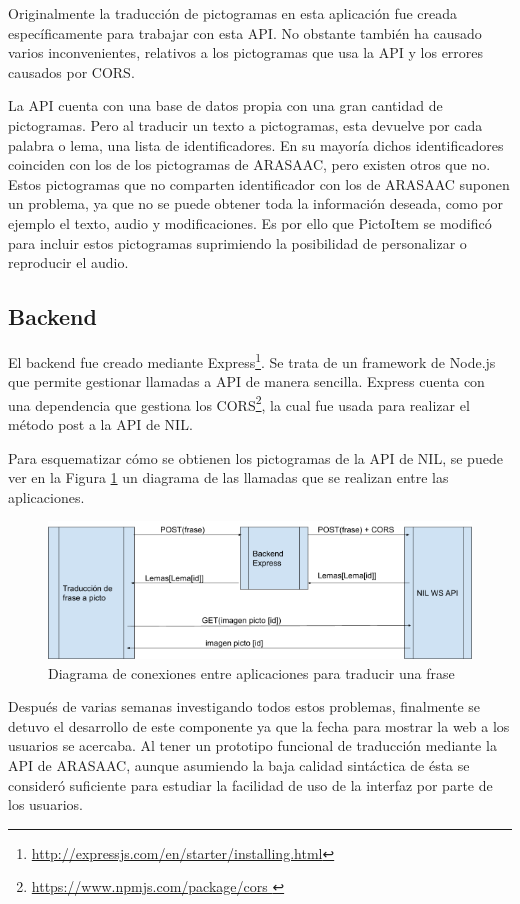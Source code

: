 Originalmente la traducción de pictogramas en esta aplicación fue creada específicamente para trabajar con esta API. No obstante también ha causado varios inconvenientes, relativos a los pictogramas que usa la API y los errores causados por CORS. 

La API cuenta con una base de datos propia con una gran cantidad de pictogramas. Pero al traducir un texto a pictogramas, esta devuelve por cada palabra o lema, una lista de identificadores. En su mayoría dichos identificadores coinciden con los de los pictogramas de ARASAAC, pero existen otros que no. Estos pictogramas que no comparten identificador con los de ARASAAC suponen un problema, ya que no se puede obtener toda la información deseada, como por ejemplo el texto, audio y modificaciones. Es por ello que PictoItem se modificó para incluir estos pictogramas suprimiendo la posibilidad de personalizar o reproducir el audio.


\subsection{Backend}
\label{backend}

El backend fue creado mediante Express\footnote{\url{http://expressjs.com/en/starter/installing.html}}. Se trata de un framework de Node.js que permite gestionar llamadas a API de manera sencilla. Express cuenta con una dependencia que gestiona los CORS\footnote{\url{https://www.npmjs.com/package/cors }}, la cual fue usada para realizar el método post a la API de NIL. 

Para esquematizar cómo se obtienen los pictogramas de la API de NIL, se puede ver en la Figura \ref{fig:diagramaconexiones} un diagrama de las llamadas que se realizan entre las aplicaciones. 

\begin{figure}[h!]
	\centering
	\includegraphics[width=0.7\linewidth]{Imagenes/Bitmap/diagramaConexiones}
	\caption{Diagrama de conexiones entre aplicaciones para traducir una frase}
	\label{fig:diagramaconexiones}
\end{figure}


Después de varias semanas investigando todos estos problemas, finalmente se detuvo el desarrollo de este componente ya que la fecha para mostrar la web a los usuarios se acercaba. Al tener un prototipo funcional de traducción mediante la API de ARASAAC, aunque asumiendo la baja calidad sintáctica de ésta se consideró suficiente para estudiar la facilidad de uso de la interfaz por parte de los usuarios.


